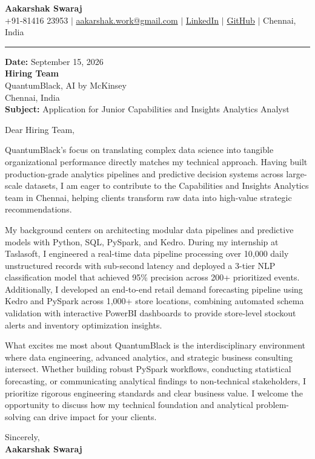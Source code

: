 \documentclass[letterpaper,11pt]{article}
\begin{document}
\begin{center}
  {\LARGE\textbf{Aakarshak Swaraj}} \\[3pt]
  \small
  +91-81416 23953 \;$|$\;
  \href{mailto:aakarshak.work@gmail.com}{aakarshak.work@gmail.com} \;$|$\;
  \href{https://www.linkedin.com/in/aakarshak-swaraj-a3ba21290}{LinkedIn} \;$|$\;
  \href{https://github.com/Krishna-Kilrofkansa}{GitHub} \;$|$\;
  Chennai, India
\end{center}

\vspace{6pt}
\hrule
\vspace{10pt}

\textbf{Date:} September 15, 2026 \\[4pt]
\textbf{Hiring Team} \\
QuantumBlack, AI by McKinsey \\
Chennai, India \\[4pt]
\textbf{Subject:} Application for Junior Capabilities and Insights Analytics Analyst

\vspace{8pt}

Dear Hiring Team,

QuantumBlack’s focus on translating complex data science into tangible organizational performance directly matches my technical approach. Having built production-grade analytics pipelines and predictive decision systems across large-scale datasets, I am eager to contribute to the Capabilities and Insights Analytics team in Chennai, helping clients transform raw data into high-value strategic recommendations.

My background centers on architecting modular data pipelines and predictive models with Python, SQL, PySpark, and Kedro. During my internship at Taslasoft, I engineered a real-time data pipeline processing over 10,000 daily unstructured records with sub-second latency and deployed a 3-tier NLP classification model that achieved 95\% precision across 200+ prioritized events. Additionally, I developed an end-to-end retail demand forecasting pipeline using Kedro and PySpark across 1,000+ store locations, combining automated schema validation with interactive PowerBI dashboards to provide store-level stockout alerts and inventory optimization insights.

What excites me most about QuantumBlack is the interdisciplinary environment where data engineering, advanced analytics, and strategic business consulting intersect. Whether building robust PySpark workflows, conducting statistical forecasting, or communicating analytical findings to non-technical stakeholders, I prioritize rigorous engineering standards and clear business value. I welcome the opportunity to discuss how my technical foundation and analytical problem-solving can drive impact for your clients.

\vspace{12pt}
Sincerely, \\[6pt]
\textbf{Aakarshak Swaraj}
\end{document}
